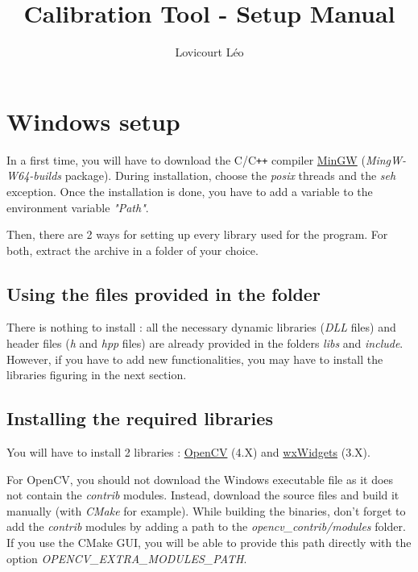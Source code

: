 \documentclass{article}
\title{Calibration Tool - Setup Manual}
\author{Lovicourt Léo}
\begin{document}
\maketitle

\section{Windows setup}

In a first time, you will have to download the C/C\texttt{++} compiler \href{https://www.mingw-w64.org/downloads/}{MinGW} (\textit{MingW-W64-builds} package). During installation, choose the \textit{posix} threads and the \textit{seh} exception. Once the installation is done, you have to add a variable to the environment variable \textit{"Path"}.\bigskip

Then, there are 2 ways for setting up every library used for the program.
For both, extract the archive in a folder of your choice.

\subsection{Using the files provided in the folder}

There is nothing to install : all the necessary dynamic libraries (\textit{DLL} files) and header files (\textit{h} and \textit{hpp} files) are already provided in the folders \textit{libs} and \textit{include}. However, if you have to add new functionalities, you may have to install the libraries figuring in the next section.

\subsection{Installing the required libraries}

You will have to install 2 libraries : \href{https://opencv.org/releases/}{OpenCV} (4.X) and \href{https://www.wxwidgets.org/downloads/}{wxWidgets} (3.X).\bigskip

For OpenCV, you should not download the Windows executable file as it does not contain the \textit{contrib} modules. Instead, download the source files and build it manually (with \textit{CMake} for example). While building the binaries, don't forget to add the \textit{contrib} modules by adding a path to the \textit{opencv\_contrib/modules} folder. If you use the CMake GUI, you will be able to provide this path directly with the option \textit{OPENCV\_EXTRA\_MODULES\_PATH}.
\end{document}
